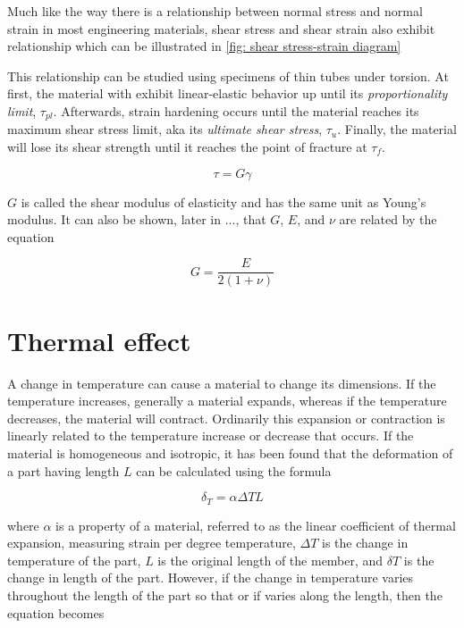 \documentclass[
fontsize=10pt,
a4paper,
twosides=false,
open=any,
svgnames,
]{kaobook} %
\begin{document}
Much like the way there is a relationship between normal stress and normal strain in most engineering materials, shear stress and shear strain also exhibit relationship which can be illustrated in \cref{fig: shear stress-strain diagram}

This relationship can be studied using specimens of thin tubes under torsion. At first, the material with exhibit linear-elastic behavior up until its \emph{proportionality limit}, $\tau_{pl}$. Afterwards, strain hardening occurs until the material reaches its maximum shear stress limit, aka its \emph{ultimate shear stress}, $\tau_{u}$. Finally, the material will lose its shear strength until it reaches the point of fracture at $\tau_{f}$.

\begin{equation}
  \tau  = G\gamma
\end{equation}

$G$ is called the shear modulus of elasticity and has the same unit as Young’s modulus. It can also be shown, later in ..., that $G$, $E$, and $\nu$ are related by the equation

\begin{equation}
  \label{eq: young and shear}
  G = \frac{E}{2(1 + \nu)}
\end{equation}

\section{Thermal effect}

A change in temperature can cause a material to change its dimensions. If the temperature increases, generally a material expands, whereas if the temperature decreases, the material will contract. Ordinarily this expansion or contraction is linearly related to the temperature increase or decrease that occurs. If the material is homogeneous and isotropic, it has been found that the deformation of a part having length $L$ can be calculated using the formula

\begin{equation}
  \delta _T = \alpha \Delta TL
\end{equation}

where $\alpha$ is a property of a material, referred to as the linear coefficient of thermal expansion, measuring strain per degree temperature, $\Delta T$ is the change in temperature of the part, $L$ is the original length of the member, and $\delta T$ is the change in length of the part. However, if the change in temperature varies throughout the length of the part so that or if varies along the length, then the equation becomes
\end{document}
